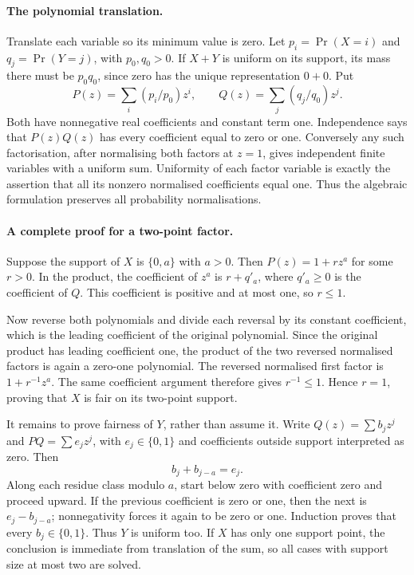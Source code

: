 \documentclass[11pt,a4paper]{article}
\begin{document}
\paragraph{The polynomial translation.}
Translate each variable so its minimum value is zero. Let $p_i=\Pr(X=i)$ and $q_j=\Pr(Y=j)$, with $p_0,q_0>0$. If $X+Y$ is uniform on its support, its mass there must be $p_0q_0$, since zero has the unique representation $0+0$. Put
\[
 P(z)=\sum_i(p_i/p_0)z^i,\qquad Q(z)=\sum_j(q_j/q_0)z^j.
\]
Both have nonnegative real coefficients and constant term one. Independence says that $P(z)Q(z)$ has every coefficient equal to zero or one. Conversely any such factorisation, after normalising both factors at $z=1$, gives independent finite variables with a uniform sum. Uniformity of each factor variable is exactly the assertion that all its nonzero normalised coefficients equal one. Thus the algebraic formulation preserves all probability normalisations.

\paragraph{A complete proof for a two-point factor.}
Suppose the support of $X$ is $\{0,a\}$ with $a>0$. Then $P(z)=1+rz^a$ for some $r>0$. In the product, the coefficient of $z^a$ is $r+q'_a$, where $q'_a\geq0$ is the coefficient of $Q$. This coefficient is positive and at most one, so $r\leq1$.

Now reverse both polynomials and divide each reversal by its constant coefficient, which is the leading coefficient of the original polynomial. Since the original product has leading coefficient one, the product of the two reversed normalised factors is again a zero-one polynomial. The reversed normalised first factor is $1+r^{-1}z^a$. The same coefficient argument therefore gives $r^{-1}\leq1$. Hence $r=1$, proving that $X$ is fair on its two-point support.

It remains to prove fairness of $Y$, rather than assume it. Write $Q(z)=\sum b_jz^j$ and $P Q=\sum e_jz^j$, with $e_j\in\{0,1\}$ and coefficients outside support interpreted as zero. Then
\[
 b_j+b_{j-a}=e_j.
\]
Along each residue class modulo $a$, start below zero with coefficient zero and proceed upward. If the previous coefficient is zero or one, then the next is $e_j-b_{j-a}$; nonnegativity forces it again to be zero or one. Induction proves that every $b_j\in\{0,1\}$. Thus $Y$ is uniform too. If $X$ has only one support point, the conclusion is immediate from translation of the sum, so all cases with support size at most two are solved.
\end{document}
